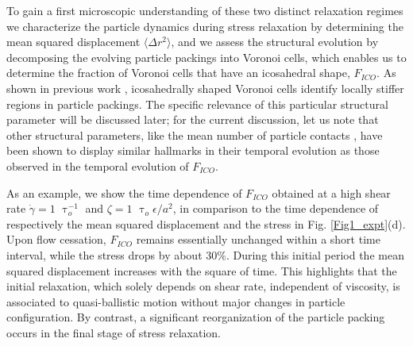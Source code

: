 \documentclass[%
preprint,
 amsmath,amssymb,
 aps,
]{revtex4-1}
\begin{document}
To gain a first microscopic understanding of these two distinct relaxation regimes we characterize the particle dynamics during stress relaxation by determining the mean squared displacement $\langle \Delta r^2 \rangle$, and we assess the structural evolution by decomposing the evolving particle packings into Voronoi cells, which enables us to determine the fraction of Voronoi cells that have an icosahedral shape, $F_{ICO}$. As shown in previous work \cite{pinney2016structure,vasisht2020emergence,vasisht2020computational}, icosahedrally shaped Voronoi cells identify locally stiffer regions in particle packings. The specific relevance of this particular structural parameter will be discussed later; for the current discussion, let us note that other structural parameters, like the mean number of particle contacts \cite{mohan2015build,mohan2013microscopic,cuny2021microscopic}, have been shown to display similar hallmarks in their temporal evolution as those observed in the temporal evolution of $F_{ICO}$.

As an example, we show the time dependence of $F_{ICO}$  obtained at a high shear rate $ \dot{\gamma} = 1$ $\uptau_o^{-1}$ and $\zeta = 1$ $\uptau_o \epsilon/a^2$, in comparison to the time dependence of respectively the mean squared displacement and the stress in Fig. \ref{Fig1_expt}(d). Upon flow cessation, $F_{ICO}$  remains essentially unchanged within a short time interval, while the stress drops by about $30\%$. During this initial period the mean squared displacement increases with the square of time. This highlights that the initial relaxation, which solely depends on shear rate, independent of viscosity, is associated to quasi-ballistic motion without major changes in particle configuration. By contrast, a significant reorganization of the particle packing occurs in the final stage of stress relaxation.    
\end{document}
